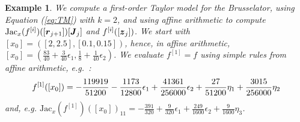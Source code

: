 \documentclass{sig-alternate-05-2015} %
\newcommand\ForAuthors[1]%
 {\par\smallskip                     %
  \begin{center}%
   \fbox%
   {\parbox{0.9\linewidth}%
    {\raggedright\sc--- #1}%
   }%
  \end{center}%
  \par\smallskip                     %
 }
\newtheorem{example}{Example}
\def\intvl#1{\mbox{$[ #1 ]$}}
\begin{document}
\begin{example}
\label{running3}
We compute a first-order Taylor model for the Brusselator, using Equation
(\ref{eq:TM}) with $k=2$, and using affine arithmetic to compute 
$\mbox{Jac}_x(f^{[i]})([\r_{j+1}])[\J_j]$ and $f^{[i]}([{\z}_j])$.
We start with 
$\intvl{x_0}=\left([2,2.5],[0.1,0.15]\right)$, hence, in affine arithmetic,
$\intvl{x_0}=\left(\frac{83}{40}+\frac{3}{40}\epsilon_1,
\frac{1}{8}+\frac{1}{40}\epsilon_2\right)$. We evaluate $f^{[1]}=f$ using
simple rules from affine arithmetic, e.g.~: 
\begin{equation}
f^{[1]}(\intvl{x_0}) 
= 
\small 
-\frac{119919}{51200}-\frac{1173}{12800} \epsilon_1+\frac{41361}{256000}\epsilon_2
\label{firstcompf1}
+\frac{27}{51200}\eta_1+\frac{3015}{256000}\eta_2
\end{equation}
\noindent and, e.g. $
\mbox{Jac}_x(f^{[1]})([x_0])_{11} %
= 
-\frac{391}{320}+\frac{9}{320}\epsilon_1+\frac{249}{1600}\epsilon_2+\frac{9}{1600}\eta_3
$. 

\end{example}
\end{document}
